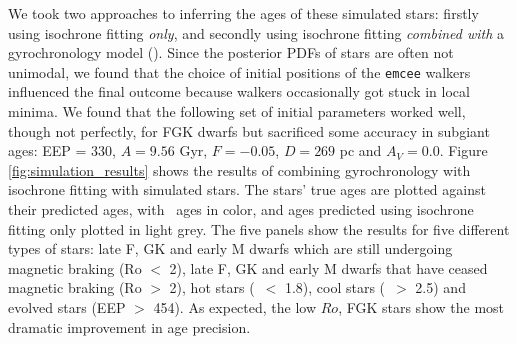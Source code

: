 We took two approaches to inferring the ages of these simulated stars:
firstly using isochrone fitting {\it only}, and secondly using isochrone
fitting {\it combined with} a gyrochronology model (\sd).
Since the posterior PDFs of stars are often not unimodal, we found that the
choice of initial positions of the {\tt emcee} walkers influenced the final
outcome because walkers occasionally got stuck in local minima.
We found that the following set of initial parameters worked well, though not
perfectly, for FGK dwarfs but sacrificed some accuracy in subgiant ages: EEP =
330, $A = 9.56$ Gyr, $F = -0.05$, $D = 269$ pc and $A_V = 0.0$.
Figure \ref{fig:simulation_results} shows the results of combining
gyrochronology with isochrone fitting with simulated stars.
The stars' true ages are plotted against their predicted ages, with \sd\ ages
in color, and ages predicted using isochrone fitting only plotted in light
grey.
The five panels show the results for five different types of stars: late F, GK
and early M dwarfs which are still undergoing magnetic braking (Ro $<$ 2),
late F, GK and early M dwarfs that have ceased magnetic braking (Ro $>$ 2),
hot stars (\gcolor\ $<$ 1.8), cool stars (\gcolor\ $>$ 2.5) and evolved stars
(EEP $>$ 454).
As expected, the low $Ro$, FGK stars show the most dramatic improvement in age
precision.
